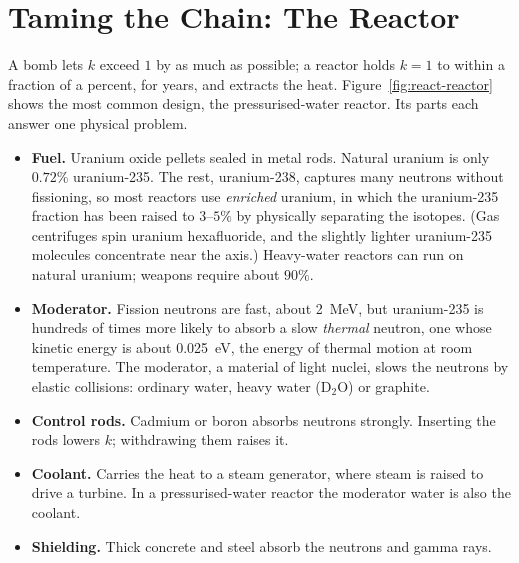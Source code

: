 \section{Taming the Chain: The Reactor}\label{sec:react-reactor}

A bomb lets $k$ exceed $1$ by as much as possible; a reactor holds $k=1$ to within a fraction of a
percent, for years, and extracts the heat. Figure~\ref{fig:react-reactor} shows the most common design,
the pressurised-water reactor. Its parts each answer one physical problem.

\begin{figure}[htbp]\centering
{}
\end{figure}

\begin{itemize}
\item \textbf{Fuel.} Uranium oxide pellets sealed in metal rods. Natural uranium is only $0.72\%$
uranium-235. The rest, uranium-238, captures many neutrons without fissioning, so most reactors use
\emph{enriched} uranium, in which the uranium-235 fraction has been raised to $3$--$5\%$ by physically
separating the isotopes. (Gas centrifuges spin uranium hexafluoride, and the slightly lighter
uranium-235 molecules concentrate near the axis.) Heavy-water reactors can run on natural uranium; weapons
require about $90\%$.
\item \textbf{Moderator.} Fission neutrons are fast, about \SI{2}{\MeV}, but uranium-235 is hundreds of
times more likely to absorb a slow \emph{thermal} neutron, one whose kinetic energy is about
\SI{0.025}{eV}, the energy of thermal motion at room temperature. The moderator, a material of light
nuclei, slows the neutrons by elastic collisions: ordinary water, heavy water ($\mathrm{D_2O}$) or
graphite.
\item \textbf{Control rods.} Cadmium or boron absorbs neutrons strongly. Inserting the rods lowers $k$;
withdrawing them raises it.
\item \textbf{Coolant.} Carries the heat to a steam generator, where steam is raised to drive a turbine.
In a pressurised-water reactor the moderator water is also the coolant.
\item \textbf{Shielding.} Thick concrete and steel absorb the neutrons and gamma rays.
\end{itemize}

